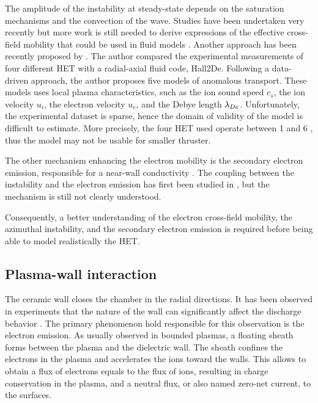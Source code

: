   The amplitude of the instability at steady-state depends on the saturation mechanisms and the convection of the wave.
  Studies have been  undertaken very recently but more work is still needed to derive expressions of the effective cross-field mobility that could be used in fluid models \citep{boeuf2017}.
  Another approach has been recently proposed by \citet{jorns2018}.
  The author compared the experimental measurements of four different \ac{HET} with a radial-axial fluid code, Hall2De.
  Following a data-driven approach, the author proposes five models of anomalous transport.
  These models uses local plasma characteristics, such as the ion sound speed $c_s$, the ion velocity $u_i$, the electron velocity $u_e$, and the Debye length $\lambda_{De}$.
  Unfortunately, the experimental dataset is sparse, hence the domain of validity of the model is difficult to estimate.
  More precisely, the four \ac{HET} used operate between 1 and 6 \kilo\watt, thus the model may not be usable for smaller thruster.
  
  \vspace{1em}
  The other mechanism enhancing the electron mobility is the secondary electron emission, responsible for a near-wall conductivity \citep{morozov1972,morozov2001, barral2003a}.
  The coupling between the instability and the electron emission has first been studied in \citet{heron2013}, but the mechanism is still not clearly understood.
  
  Consequently, a better understanding of the electron cross-field mobility, the azimuthal instability, and the secondary electron emission is required before being able to model realistically the \ac{HET}.
  
  
\subsection{Plasma-wall interaction}

  The ceramic wall closes the chamber in the radial directions.
  It has been observed in experiments that the nature of the wall can significantly affect the discharge behavior \citep{gascon2003}.
  The primary phenomenon hold responsible for this observation is the electron emission.
  As usually observed in bounded plasmas, a floating sheath forms between the plasma and the dielectric wall.
  The sheath confines the electrons in the plasma and accelerates the ions toward the walls.
  This allows to obtain a flux of electrons equals to the flux of ions, resulting in charge conservation in the plasma, and a neutral flux, or also named zero-net current, to the surfaces.
  

